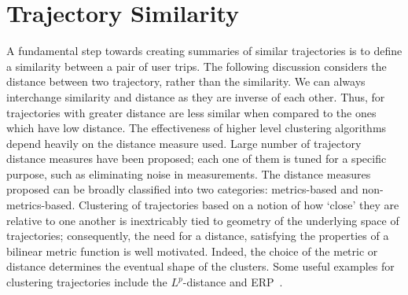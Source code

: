 \section{Trajectory Similarity}
\label{sec:trajDist}
\begin{comment}
\begin{table*}
	\centering
		\begin{tabular}{|c|c|c|c|c|c|} 
			\hline
			Sim Measure&Is Metric&Type&Sen. to sample noise&OD Cognizant&Computational Cost\\
			\hline
			LP Norm&Yes&Sampling Sensitive&No&No&O(N)\\
			DTW/LCSS/EDW/EDW With real sequences&No&Sampling Sensitive&Yes&No&O($n^2$)\\
			EDWP&Yes&Sampling Sensitive&Yes&No&??\\
			LP Norm with Interpolation&Yes&Shape Sensitive&No&No&O(Num samples)\\
			ODSim (Ours)&Yes&Shape sensitive&No&No&O(Num samples)\\
			\hline
		\end{tabular}
	\caption{Taxonomy of Similarity Measures}
	\label{tab:simTaxonomy}
\end{table*}
\end{comment}

A fundamental step towards creating summaries of similar trajectories is to define a similarity between a pair of user trips. The following discussion considers the distance between two trajectory, rather than the similarity. We can always interchange similarity and distance as they are inverse of each other. Thus, for trajectories with greater distance are less similar when compared to the ones which have low distance. The effectiveness of higher level clustering algorithms depend heavily on the distance measure used. Large number of trajectory distance measures have been proposed; each one of them is tuned for a specific purpose, such as eliminating noise in measurements. The distance measures proposed can be broadly classified into two categories: metrics-based and non-metrics-based. Clustering of trajectories based on a notion of how `close' they are relative to one another is inextricably tied to geometry of the underlying space of trajectories; consequently, the need for a distance, satisfying the properties of a bilinear metric function is well motivated. Indeed, the choice of the metric or distance determines the eventual shape of the clusters. Some useful examples for clustering trajectories include the $L^p$-distance and ERP~\cite{Chen2004}. 

